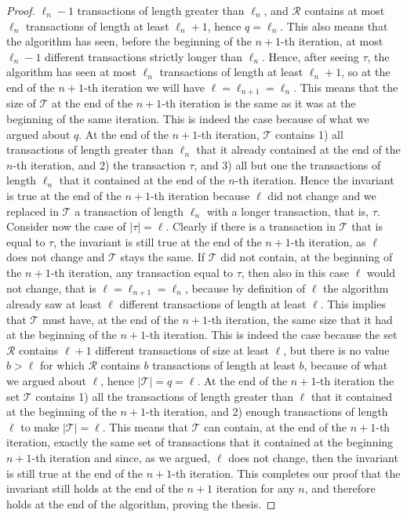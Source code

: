 \begin{proof}
  $\ell_n-1$ transactions of length greater than $\ell_n$, and $\mathcal{R}$
  contains at most $\ell_n$ transactions of length at least $\ell_n+1$, hence
  $q=\ell_n$. This also means that the algorithm has seen, before the beginning
  of the $n+1$-th iteration, at most $\ell_n-1$ different transactions strictly longer
  than $\ell_n$. Hence, after seeing $\tau$, the algorithm has seen at most
  $\ell_n$ transactions of length at least $\ell_n+1$,  so at the end of the
  $n+1$-th iteration we will have $\ell=\ell_{n+1}=\ell_n$. This means that the
  size of $\mathcal{T}$ at the end of the $n+1$-th iteration is the same as it
  was at the beginning of the same iteration. This is indeed the case because of
  what we argued about $q$. At the end of the $n+1$-th iteration, $\mathcal{T}$
  contains 1) all transactions of length greater than $\ell_n$ that it already
  contained at the end of the $n$-th iteration, and 2) the transaction $\tau$, and
  3) all but one the transactions of length $\ell_n$ that it contained at the
  end of the $n$-th iteration. Hence the invariant is true at the end of the
  $n+1$-th iteration because $\ell$ did not change and we replaced in
  $\mathcal{T}$ a transaction of length $\ell_n$ with a longer transaction,
  that is, $\tau$. Consider now the case of $|\tau|=\ell$. Clearly if there is
  a transaction in $\mathcal{T}$ that is equal to $\tau$, the invariant is still
  true at the end of the $n+1$-th iteration, as $\ell$ does not change and
  $\mathcal{T}$ stays the same. If $\mathcal{T}$ did not contain, at the
  beginning of the $n+1$-th iteration, any transaction equal to $\tau$, then also in this case
  $\ell$ would not change, that is $\ell=\ell_{n+1}=\ell_n$, because by
  definition of $\ell$ the algorithm already saw at least $\ell$ different
  transactions of length at least $\ell$. This implies that $\mathcal{T}$ must
  have, at the end of the $n+1$-th iteration, the same size that it had at the
  beginning of the $n+1$-th iteration. This is indeed the case because the set $\mathcal{R}$ 
  contains $\ell+1$ different transactions of size at least $\ell$, but there is
  no value $b>\ell$ for which $\mathcal{R}$ contains $b$ transactions of length
  at least $b$, because of what we argued about $\ell$, hence
  $|\mathcal{T}|=q=\ell$. At the end of the $n+1$-th iteration the set
  $\mathcal{T}$ contains 1) all the transactions of length greater than $\ell$ that
  it contained at the beginning of the $n+1$-th iteration, and 2) enough transactions of
  length $\ell$ to make $|\mathcal{T}|=\ell$. This means that $\mathcal{T}$ can
  contain, at the end of the $n+1$-th iteration, exactly the same set of
  transactions that it contained at the beginning $n+1$-th iteration and since, 
  as we argued, $\ell$ does not change, then the invariant is still true at the
  end of the $n+1$-th iteration. This completes our proof that the invariant
  still holds at the end of the $n+1$ iteration for any $n$, and therefore holds
  at the end of the algorithm, proving the thesis.
\end{proof}

